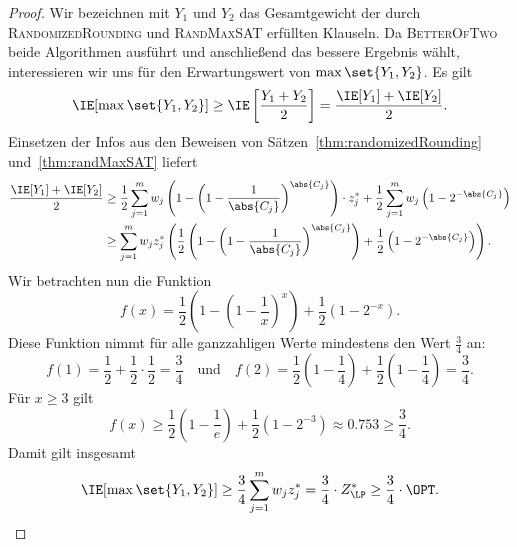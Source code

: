 \documentclass[language=ngerman,algolist]{TemplateLecture}
\begin{document}
\begin{proof}
    Wir bezeichnen mit $Y_1$ und $Y_2$ das Gesamtgewicht der durch \textsc{RandomizedRounding} und \textsc{RandMaxSAT} erfüllten Klauseln. Da \textsc{BetterOfTwo} beide Algorithmen ausführt und anschließend das bessere Ergebnis wählt, interessieren wir uns für den Erwartungswert von $\max\set{Y_1, Y_2}$. Es gilt
    \begin{equation*}
        \IE[\max\set{Y_1, Y_2}] \geq \IE\left[ \frac{Y_1 + Y_2}{2} \right] = \frac{\IE[Y_1] + \IE[Y_2]}{2}.
    \end{equation*}
    Einsetzen der Infos aus den Beweisen von Sätzen~\ref{thm:randomizedRounding} und~\ref{thm:randMaxSAT} liefert 
    \begin{equation*}
        \begin{split}
            \frac{\IE[Y_1] + \IE[Y_2]}{2} &\geq \frac{1}{2}\sum_{j = 1}^m w_j \left( 1 - \left( 1 - \frac{1}{\abs{C_j}} \right)^{\abs{C_j}} \right) \cdot z_j^* + \frac{1}{2}\sum_{j = 1}^m w_j\left(1 - 2^{-\abs{C_j}}\right) \\
            &\geq \sum_{j = 1}^m w_j z_j^* \left( \frac{1}{2} \left( 1 - \left( 1 - \frac{1}{\abs{C_j}} \right)^{\abs{C_j}} \right) + \frac{1}{2} \left( 1 - 2^{-\abs{C_j}} \right) \right).
        \end{split}
    \end{equation*}
    Wir betrachten nun die Funktion
    \begin{equation*}
        f(x) = \frac{1}{2}\left( 1 - \left( 1 - \frac{1}{x} \right)^x \right) + \frac{1}{2}\left( 1 - 2^{-x} \right).
    \end{equation*}
    Diese Funktion nimmt für alle ganzzahligen Werte mindestens den Wert $\frac{3}{4}$ an:
    \begin{equation*}
        f(1) = \frac{1}{2} + \frac{1}{2} \cdot \frac{1}{2} = \frac{3}{4} \quad \text{und} \quad f(2) = \frac{1}{2}\left( 1 - \frac{1}{4} \right) + \frac{1}{2} \left( 1 - \frac{1}{4} \right) = \frac{3}{4}.
    \end{equation*}
    Für $x \geq 3$ gilt 
    \begin{equation*}
        f(x) \geq \frac{1}{2}\left( 1 - \frac{1}{e} \right) + \frac{1}{2}\left( 1 - 2^{-3} \right) \approx 0.753 \geq \frac{3}{4}.
    \end{equation*}
    Damit gilt insgesamt 
    \begin{equation*}
        \IE[\max\set{Y_1, Y_2}] \geq \frac{3}{4}\sum_{j = 1}^m w_j z_j^* = \frac{3}{4} \cdot Z^*_{\LP} \geq \frac{3}{4} \cdot \OPT. \qedhere
    \end{equation*}
\end{proof}
\end{document}
